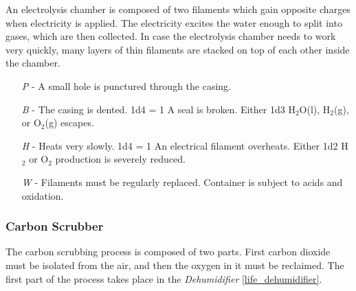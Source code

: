 \documentclass[a4paper]{article}
\begin{document}
An electrolysis chamber is composed of two filaments which gain opposite charges when electricity is applied. The electricity excites the water enough to split into gases, which are then collected. In case the electrolysis chamber needs to work very quickly, many layers of thin filaments are stacked on top of each other inside the chamber. 
\begin{enumerate}
\item [\textit{P}] - A small hole is punctured through the casing. \newline 
\hspace*{3pt}  \\
\item [\textit{B}] - The casing is dented. \newline \hspace*{3pt} 1d4 = 1 A seal is broken. Either 1d3 H$_2$O(l), H$_2$(g), or O$_2$(g) escapes.
\item [\textit{H}] - Heats very slowly. \newline \hspace*{3pt} 1d4 = 1 An electrical filament overheats. Either 1d2 H$_2$ or O$_2$ production is severely reduced.
\item [\textit{W}] - Filaments must be regularly replaced. Container is subject to acids and oxidation.
\end{enumerate}

\vspace{-0.5cm} \hspace{-18pt} \subsubsection{Carbon Scrubber} \label{life_c_scrubber} \vspace{-0.2cm}
The carbon scrubbing process is composed of two parts. First carbon dioxide must be isolated from the air, and then the oxygen in it must be reclaimed. The first part of the process takes place in the \textit{Dehumidifier} \ref{life_dehumidifier}.
\end{document}
